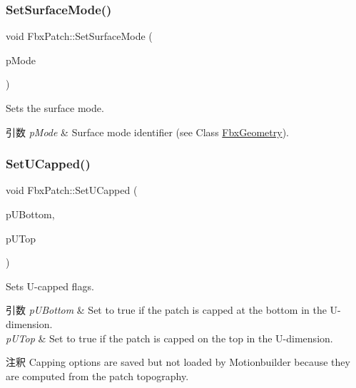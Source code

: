 \subsubsection{\texorpdfstring{Set\+Surface\+Mode()}{SetSurfaceMode()}}
{\footnotesize\ttfamily void Fbx\+Patch\+::\+Set\+Surface\+Mode (\begin{DoxyParamCaption}\item[{\hyperlink{class_fbx_geometry_adb9d2e34481a2cb40f1d783c665794db}{Fbx\+Geometry\+::\+E\+Surface\+Mode}}]{p\+Mode }\end{DoxyParamCaption})}

Sets the surface mode. 
\begin{DoxyParams}{引数}
{\em p\+Mode} & Surface mode identifier (see Class \hyperlink{class_fbx_geometry}{Fbx\+Geometry}). \\
\hline
\end{DoxyParams}
\mbox{\label{class_fbx_patch_a9bd77e38cd9e41cf52638272fb240fdf}} 
\subsubsection{\texorpdfstring{Set\+U\+Capped()}{SetUCapped()}}
{\footnotesize\ttfamily void Fbx\+Patch\+::\+Set\+U\+Capped (\begin{DoxyParamCaption}\item[{bool}]{p\+U\+Bottom,  }\item[{bool}]{p\+U\+Top }\end{DoxyParamCaption})}

Sets U-\/capped flags. 
\begin{DoxyParams}{引数}
{\em p\+U\+Bottom} & Set to {\ttfamily true} if the patch is capped at the bottom in the U-\/dimension. \\
\hline
{\em p\+U\+Top} & {\ttfamily Set} to {\ttfamily true} if the patch is capped on the top in the U-\/dimension. \\
\hline
\end{DoxyParams}
\begin{DoxyRemark}{注釈}
Capping options are saved but not loaded by Motionbuilder because they are computed from the patch topography. 
\end{DoxyRemark}
\mbox{\label{class_fbx_patch_a11fa20b64650ce4312b5238e8fde6cb8}} 
